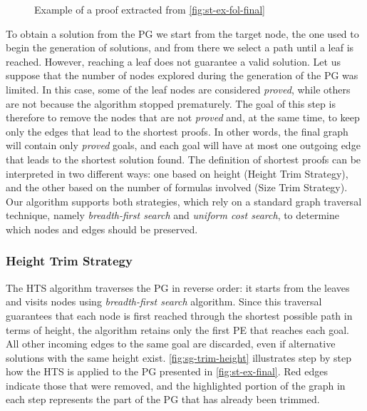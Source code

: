 \begin{figure}[ht]
\centering
\small

\begin{prooftree}


  
\end{prooftree}
\caption{Example of a proof extracted from \autoref{fig:st-ex-fol-final} }
\label{fig:sol-pg-fol}
\end{figure}

To obtain a solution from the \gls{PG} we start from the target node, the one used to begin the generation of solutions, and from there we select a path until a leaf is reached. However, reaching a leaf does not guarantee a valid solution. Let us suppose that the number of nodes explored during the generation of the \gls{PG} was limited. In this case, some of the leaf nodes are considered \emph{proved}, while others are not because the algorithm stopped prematurely. The goal of this step is therefore to remove the nodes that are not \emph{proved} and, at the same time, to keep only the edges that lead to the shortest proofs. In other words, the final graph will contain only \emph{proved} goals, and each goal will have at most one outgoing edge that leads to the shortest solution found.
The definition of shortest proofs can be interpreted in two different ways: one based on height (Height Trim Strategy), and the other based on the number of formulas involved (Size Trim Strategy). Our algorithm supports both strategies, which rely on a standard graph traversal technique, namely \emph{breadth-first search} and \emph{uniform cost search}, to determine which nodes and edges should be preserved.

\subsubsection*{Height Trim Strategy} 
The \gls{HTS} algorithm traverses the \gls{PG} in reverse order: it starts from the leaves and visits nodes using \emph{breadth-first search} algorithm. Since this traversal guarantees that each node is first reached through the shortest possible path in terms of height, the algorithm retains only the first \gls{PE} that reaches each goal. All other incoming edges to the same goal are discarded, even if alternative solutions with the same height exist. \autoref{fig:sg-trim-height} illustrates step by step how the \gls{HTS} is applied to the \gls{PG} presented in \autoref{fig:st-ex-final}. Red edges indicate those that were removed, and the highlighted portion of the graph in each step represents the part of the \gls{PG} that has already been trimmed.

